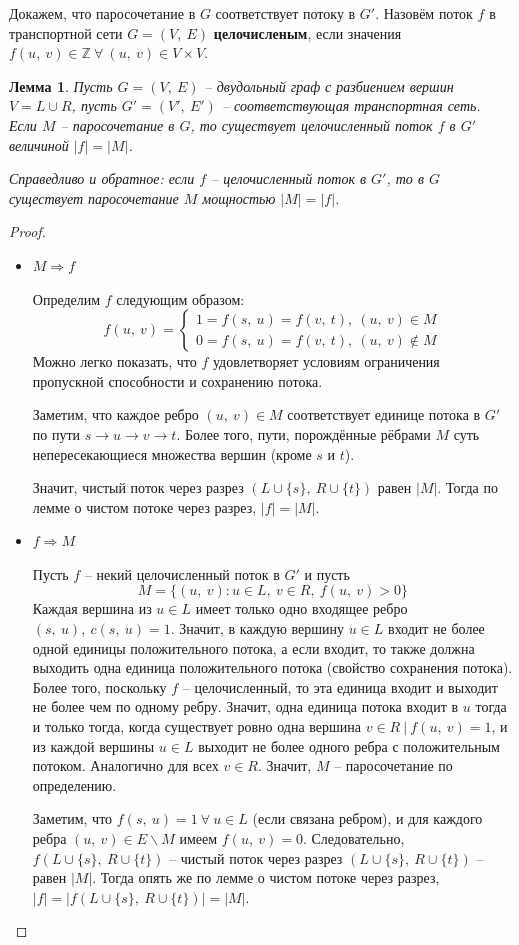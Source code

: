\documentclass[a4paper,12pt]{article}
\newtheorem*{fulllemma}{Лемма}
\newcommand{\Z}{\mathbb{Z}}
\begin{document}
Докажем, что паросочетание в $G$ соответствует потоку в $G'$. Назовём поток $f$ в транспортной сети $G = (V,\ E)$ \textbf{целочисленым}, если значения $f(u,\ v) \in \Z\ \forall\ (u,\ v) \in V\times V$.
\begin{fulllemma}
Пусть $G = (V,\ E)$ -- двудольный граф с разбиением вершин $V = L \cup R$, пусть $G' = (V',\ E')$ -- соответствующая транспортная сеть. Если $M$ -- паросочетание в $G$, то существует целочисленный поток $f$ в $G'$ величиной $|f| = |M|$.

Справедливо и обратное: если $f$ -- целочисленный поток в $G'$, то в $G$ существует паросочетание $M$ мощностью $|M| = |f|$.
\end{fulllemma}
\begin{proof}
\begin{itemize}
\ \\
    \item $M \Longrightarrow f$
    
    Определим $f$ следующим образом: \[f(u,\ v) = \begin{cases} 1 = f(s,\ u) = f(v,\ t),\ (u,\ v) \in M \\ 0 = f(s,\ u) = f(v,\ t),\ (u,\ v) \notin M\end{cases}\] Можно легко показать, что $f$ удовлетворяет условиям ограничения пропускной способности и сохранению потока.
    
    Заметим, что каждое ребро $(u,\ v) \in M$ соответствует единице потока в $G'$ по пути $s \to u \to v \to t$. Более того, пути, порождённые рёбрами $M$ суть непересекающиеся множества вершин (кроме $s$ и $t$).
    
    Значит, чистый поток через разрез $(L \cup \{s\},\ R \cup \{t\})$ равен $|M|$. Тогда по лемме о чистом потоке через разрез, $|f| = |M|$.
    
    \item $f \Longrightarrow M$
    
    Пусть $f$ -- некий целочисленный поток в $G'$ и пусть\[ M = \{(u,\ v): u \in L,\ v \in R,\ f(u,\ v) > 0\}\]
    Каждая вершина из $u \in L$ имеет только одно входящее ребро $(s,\ u),\ c(s,\ u) = 1$. Значит, в каждую вершину $u \in L$ входит не более одной единицы  положительного потока, а если входит, то также должна выходить одна единица положительного потока (свойство сохранения потока). Более того, поскольку $f$ -- целочисленный, то эта единица входит и выходит не более чем по одному ребру. Значит, одна единица потока входит в $u$ тогда и только тогда, когда существует ровно одна вершина $v \in R\ |\ f(u,\ v) = 1$, и из каждой вершины $u\in L$ выходит не более одного ребра с положительным потоком. Аналогично для всех $v \in R$. Значит, $M$ -- паросочетание по определению.
    
    Заметим, что $f(s,\ u) = 1\ \forall\ u \in L$ (если связана ребром), и для каждого ребра $(u,\ v) \in E\backslash M$ имеем $f(u,\ v) = 0$. Следовательно, $f(L\cup \{s\},\ R\cup \{t\})$ -- чистый поток через разрез $(L\cup \{s\},\ R\cup \{t\})$ -- равен $|M|$. Тогда опять же по лемме о чистом потоке через разрез, $|f| = |f(L\cup \{s\},\ R\cup \{t\})| = |M|$.
\end{itemize}
\end{proof}
\end{document}
